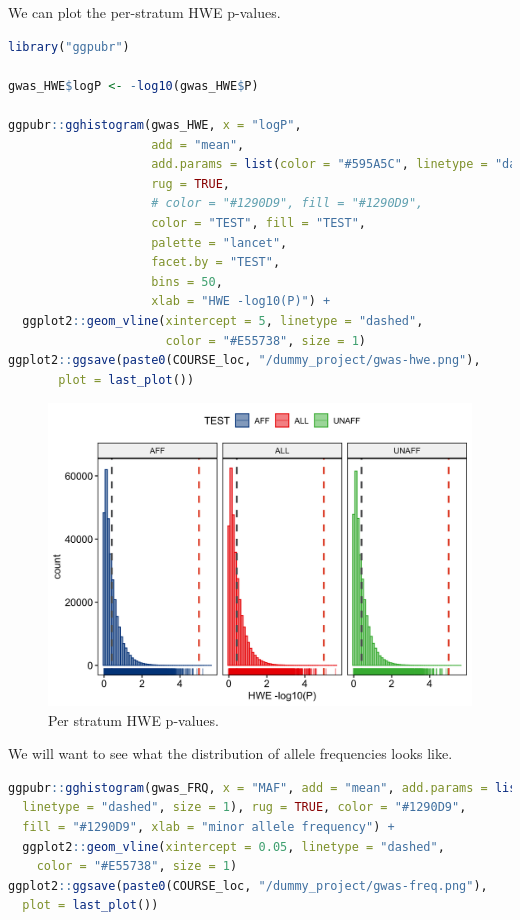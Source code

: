 \documentclass[
]{book}
\begin{document}
We can plot the per-stratum HWE p-values.

\begin{lstlisting}[language=R]
library("ggpubr")

gwas_HWE$logP <- -log10(gwas_HWE$P)

ggpubr::gghistogram(gwas_HWE, x = "logP",
                    add = "mean",
                    add.params = list(color = "#595A5C", linetype = "dashed", size = 1),
                    rug = TRUE,
                    # color = "#1290D9", fill = "#1290D9",
                    color = "TEST", fill = "TEST",
                    palette = "lancet",
                    facet.by = "TEST",
                    bins = 50,
                    xlab = "HWE -log10(P)") +
  ggplot2::geom_vline(xintercept = 5, linetype = "dashed",
                      color = "#E55738", size = 1)
ggplot2::ggsave(paste0(COURSE_loc, "/dummy_project/gwas-hwe.png"),
       plot = last_plot())
\end{lstlisting}

\begin{figure}[H]

{\centering \includegraphics[width=18.67in]{img/_gwas_dummy/show-hwe-gwas} 

}

\caption{Per stratum HWE p-values.}\label{fig:show-hwe-gwas}
\end{figure}

We will want to see what the distribution of allele frequencies looks like.

\begin{lstlisting}[language=R]
ggpubr::gghistogram(gwas_FRQ, x = "MAF", add = "mean", add.params = list(color = "#595A5C",
  linetype = "dashed", size = 1), rug = TRUE, color = "#1290D9",
  fill = "#1290D9", xlab = "minor allele frequency") +
  ggplot2::geom_vline(xintercept = 0.05, linetype = "dashed",
    color = "#E55738", size = 1)
ggplot2::ggsave(paste0(COURSE_loc, "/dummy_project/gwas-freq.png"),
  plot = last_plot())
\end{lstlisting}
\end{document}
